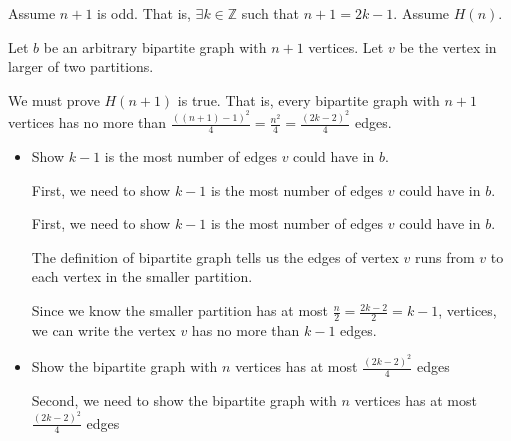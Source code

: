 \documentclass[12pt]{article}
\begin{document}
\begin{enumerate}[a.]
\begin{mdframed}
\begin{enumerate}[1.]
\begin{enumerate}[1.]
                \bigskip

                Assume $n+1$ is odd. That is, $\exists k \in \mathbb{Z}$ such that
                $n+1 = 2k-1$. Assume $H(n)$.

                \bigskip

                Let $b$ be an arbitrary bipartite graph with $n+1$ vertices. Let
                $v$ be the vertex in larger of two partitions.

                \bigskip

                We must prove $H(n+1)$ is true. That is, every bipartite graph
                with $n+1$ vertices has no more than $\frac{((n+1)-1)^2}{4} = \frac{n^2}{4} = \frac{(2k-2)^2}{4}$
                edges.

                \bigskip

                \begin{itemize}
                    \item Show $k-1$ is the most number of edges $v$ could have
                    in $b$.

                    First, we need to show $k-1$ is the most number of edges $v$
                    could have in $b$.

                    \begin{mdframed}
                    First, we need to show $k-1$ is the most number of edges $v$
                    could have in $b$.

                    \bigskip

                    The definition of bipartite graph tells us the edges of vertex
                    $v$ runs from $v$ to each vertex in the smaller partition.

                    \bigskip

                    Since we know the smaller partition has at most $\frac{n}{2} = \frac{2k-2}{2} = k - 1$,
                    vertices, we can write the vertex $v$ has no more than $k-1$ edges.

                    \end{mdframed}

                    \item Show the bipartite graph with $n$ vertices has
                    at most $\frac{(2k-2)^2}{4}$ edges

                    \begin{mdframed}
                    Second, we need to show the bipartite graph with $n$ vertices has
                    at most $\frac{(2k-2)^2}{4}$ edges


\end{mdframed}
\end{itemize}
\end{enumerate}
\end{enumerate}
\end{mdframed}
\end{enumerate}
\end{document}
